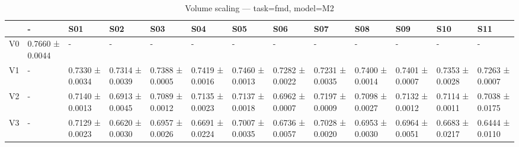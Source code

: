 \begin{table}[htbp]
\centering
\caption{Volume scaling — task=fmd, model=M2}
\label{tab:volume:fmd:M2}
\begin{tabular}{lllllllllllll}
\toprule
\toprule
 & - & S01 & S02 & S03 & S04 & S05 & S06 & S07 & S08 & S09 & S10 & S11 \\
\midrule
\midrule
V0 & 0.7660 ± 0.0044 & - & - & - & - & - & - & - & - & - & - & - \\
V1 & - & 0.7330 ± 0.0034 & 0.7314 ± 0.0039 & 0.7388 ± 0.0005 & 0.7419 ± 0.0016 & 0.7460 ± 0.0013 & 0.7282 ± 0.0022 & 0.7231 ± 0.0035 & 0.7400 ± 0.0014 & 0.7401 ± 0.0007 & 0.7353 ± 0.0028 & 0.7263 ± 0.0007 \\
V2 & - & 0.7140 ± 0.0013 & 0.6913 ± 0.0045 & 0.7089 ± 0.0012 & 0.7135 ± 0.0023 & 0.7137 ± 0.0018 & 0.6962 ± 0.0007 & 0.7197 ± 0.0009 & 0.7098 ± 0.0027 & 0.7132 ± 0.0012 & 0.7114 ± 0.0011 & 0.7038 ± 0.0175 \\
V3 & - & 0.7129 ± 0.0023 & 0.6620 ± 0.0030 & 0.6957 ± 0.0026 & 0.6691 ± 0.0224 & 0.7007 ± 0.0035 & 0.6736 ± 0.0057 & 0.7028 ± 0.0020 & 0.6953 ± 0.0030 & 0.6964 ± 0.0051 & 0.6683 ± 0.0217 & 0.6444 ± 0.0110 \\
\bottomrule
\end{tabular}\end{table}
